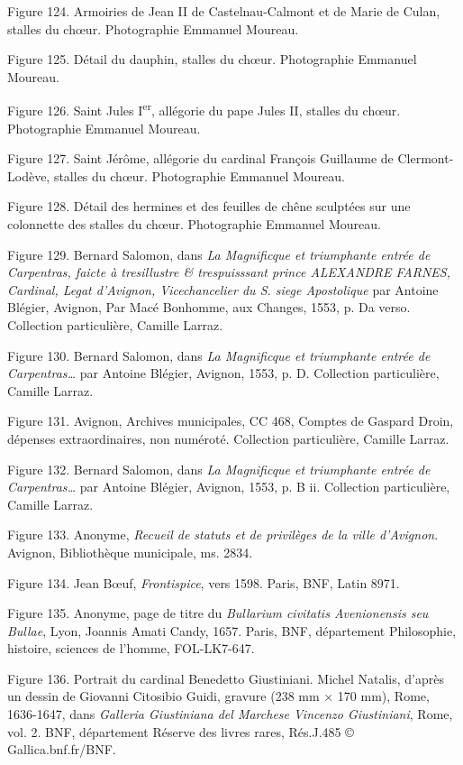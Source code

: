 \documentclass[12pt,twoside,openany]{book}
\begin{document}
Figure 124. Armoiries de Jean II de Castelnau-Calmont et de Marie de Culan, stalles du chœur. Photographie Emmanuel Moureau.

Figure 125. Détail du dauphin, stalles du chœur. Photographie Emmanuel Moureau.

Figure 126. Saint Jules I\textsuperscript{er}, allégorie du pape Jules II, stalles du chœur. Photographie Emmanuel Moureau.

Figure 127. Saint Jérôme, allégorie du cardinal François Guillaume de Clermont-Lodève, stalles du chœur. Photographie Emmanuel Moureau.

Figure 128. Détail des hermines et des feuilles de chêne sculptées sur une colonnette des stalles du chœur. Photographie Emmanuel Moureau.

Figure 129. Bernard Salomon, dans \textit{La Magnificque et triumphante entrée de Carpentras, faicte à tresillustre \& trespuisssant prince ALEXANDRE FARNES, Cardinal, Legat d’Avignon, Vicechancelier du S. siege Apostolique} par Antoine Blégier, Avignon, Par Macé Bonhomme, aux Changes, 1553, p. Da verso. Collection particulière, Camille Larraz.

Figure 130. Bernard Salomon, dans \textit{La Magnificque et triumphante entrée de Carpentras… }par Antoine Blégier, Avignon, 1553, p. D. Collection particulière, Camille Larraz.

Figure 131. Avignon, Archives municipales, CC 468, Comptes de Gaspard Droin, dépenses extraordinaires, non numéroté. Collection particulière, Camille Larraz.

Figure 132. Bernard Salomon, dans \textit{La Magnificque et triumphante entrée de Carpentras… }par Antoine Blégier, Avignon, 1553, p. B ii. Collection particulière, Camille Larraz.

Figure 133. Anonyme, \textit{Recueil de statuts et de privilèges de la ville d’Avignon}. Avignon, Bibliothèque municipale, ms. 2834.

Figure 134. Jean Bœuf, \textit{Frontispice}, vers 1598. Paris, BNF, Latin 8971.

Figure 135. Anonyme, page de titre du \textit{Bullarium civitatis Avenionensis seu Bullae}, Lyon, Joannis Amati Candy, 1657. Paris, BNF, département Philosophie, histoire, sciences de l’homme, FOL-LK7-647.

Figure 136. Portrait du cardinal Benedetto Giustiniani. Michel Natalis, d’après un dessin de Giovanni Citosibio Guidi, gravure (238 mm × 170 mm), Rome, 1636-1647, dans \textit{Galleria Giustiniana del Marchese Vincenzo Giustiniani}, Rome, vol. 2. BNF, département Réserve des livres rares, Rés.J.485 © Gallica.bnf.fr/BNF.
\end{document}
